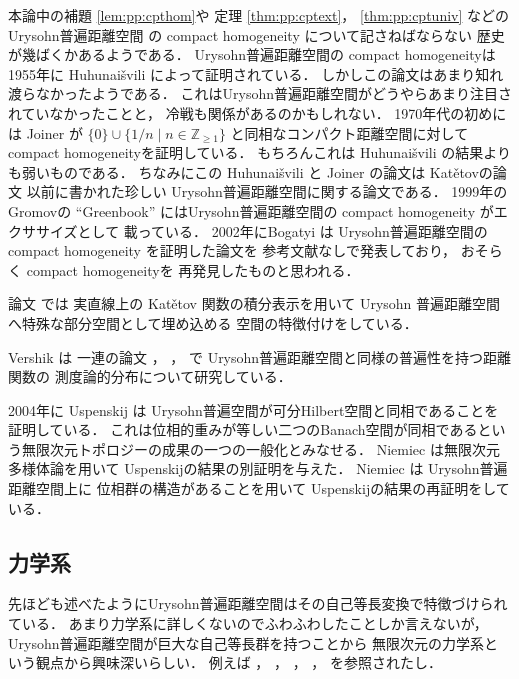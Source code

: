 \documentclass[leqno, 12pt]{jsarticle}
\newcommand{\zz}{\mathbb{Z}}
\newcommand{\yozz}[1]{\zz_{\ge #1}}
\begin{document}
本論中の補題
 \ref{lem:pp:cpthom}や
 定理
 \ref{thm:pp:cptext}，
\ref{thm:pp:cptuniv}
などの
Urysohn普遍距離空間
の
compact homogeneity
について記さねばならない
歴史が幾ばくかあるようである．
Urysohn普遍距離空間の
compact homogeneityは
1955年に
Huhunai\v{s}vili
 \cite{huhu}
 によって証明されている．
しかしこの論文はあまり知れ渡らなかったようである．
これはUrysohn普遍距離空間がどうやらあまり注目されていなかったことと，
冷戦も関係があるのかもしれない．
1970年代の初めには
Joiner
\cite{J}が
$\{0\}\cup\{1/n\mid n\in \yozz{1}\}$
と同相なコンパクト距離空間に対してcompact homogeneityを証明している．
もちろんこれは
Huhunai\v{s}vili
の結果よりも弱いものである．
ちなみにこの
Huhunai\v{s}vili
と
Joiner
の論文は
Kat\v{e}tovの論文 \cite{Ka}
以前に書かれた珍しい
Urysohn普遍距離空間に関する論文である．
1999年のGromovの
``Greenbook'' \cite{Greenbook}
にはUrysohn普遍距離空間の
compact homogeneity
がエクササイズとして
載っている．
2002年にBogatyi
\cite{Bogatyi}は
Urysohn普遍距離空間の
compact homogeneity
を証明した論文を
参考文献なしで発表しており，
おそらく
compact homogeneityを
再発見したものと思われる．


論文 \cite{Nie}では
実直線上の
Kat\v{e}tov
関数の積分表示を用いて
Urysohn
普遍距離空間へ特殊な部分空間として埋め込める
空間の特徴付けをしている．


Vershik
は
一連の論文
 \cite{Ver0}，
 \cite{Ver2002}，
  \cite{Ver}
  で
Urysohn普遍距離空間と同様の普遍性を持つ距離関数の
測度論的分布について研究している．

2004年に
Uspenskij
\cite{Usp2004}は
Urysohn普遍空間が可分Hilbert空間と同相であることを証明している．
これは位相的重みが等しい二つのBanach空間が同相であるという無限次元トポロジーの成果の一つの一般化とみなせる．
Niemiec
 \cite{Nie2011}
 は無限次元多様体論を用いて
Uspenskijの結果の別証明を与えた．
Niemiec
\cite{NieANR}
は
Urysohn普遍距離空間上に
位相群の構造があることを用いて
Uspenskijの結果の再証明をしている．


\subsection{力学系}\label{subsec:research:dynamics}
先ほども述べたようにUrysohn普遍距離空間はその自己等長変換で特徴づけられている．
あまり力学系に詳しくないのでふわふわしたことしか言えないが，
Urysohn普遍距離空間が巨大な自己等長群を持つことから
無限次元の力学系という観点から興味深いらしい．
例えば
\cite{Mell2008}，
 \cite{LS}，
 \cite{Sau2}，
 \cite{Pestov1}，
 \cite{Pestov2}
 を参照されたし．
\end{document}
